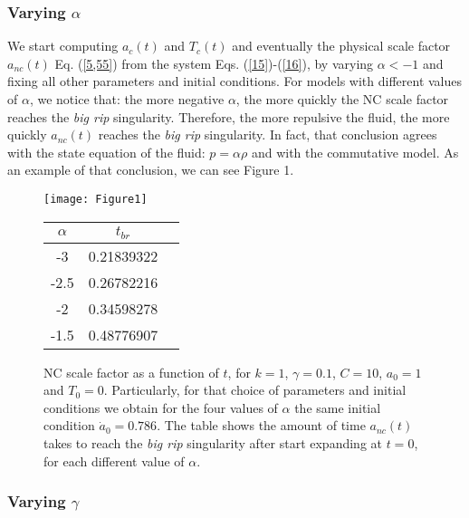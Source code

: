 \documentclass[12pt]{article}
\newcommand{\0}{{(0)}}
\newcommand{\1}{{(1)}}
\newcommand{\2}{{(2)}}
\begin{document}
{\subsubsection{Varying $\alpha$}

We start computing $a_c(t)$ and $T_c(t)$ and eventually the physical scale factor $a_{nc}(t)$ Eq. (\ref{5,55}) from the system
Eqs. (\ref{15})-(\ref{16}), by varying $\alpha < -1$ and fixing all other parameters and initial conditions. 
For models with different values of $\alpha$, we notice that: the more negative $\alpha$, the more quickly the NC scale
factor reaches the {\it big rip} singularity. Therefore, the more repulsive the fluid, the more quickly $a_{nc}(t)$ reaches the
{\it big rip} singularity. In fact, that conclusion agrees with the state equation of the fluid: $p = \alpha\rho$ and with the
commutative model. As an example of that conclusion, we can see Figure 1.

\begin{figure}[!htb]
	\centering
	\begin{minipage}[c]{0.49\linewidth}
		\centering
		\texttt{[image: Figure1]}
	\end{minipage}
	\hfill
	\begin{minipage}[c]{0.49\linewidth}
		\centering
		\begin{tabular}{ccc}\hline
			$\alpha$ & $t_{br}$ \\ \hline
			-3 & 0.21839322 \\
			-2.5 & 0.26782216 \\
			-2 & 0.34598278 \\
			-1.5 & 0.48776907 \\ \hline
		\end{tabular}
	\end{minipage}
		\caption{NC scale factor as a function of $t$, for $k=1$, $\gamma = 0.1$, $C = 10$, $a_0 = 1$ and $T_0 = 0$. 
		Particularly, for that choice of parameters and initial conditions we obtain for the four values of $\alpha$ the same initial condition $\dot{a}_0 = 0.786$.
		The table shows the amount of time $a_{nc}(t)$ takes to reach the {\it big rip} singularity after start expanding at $t=0$, 
		for each different value of $\alpha$.}\label{fig1}
\end{figure}

\subsubsection{Varying $\gamma$}

}
\end{document}

